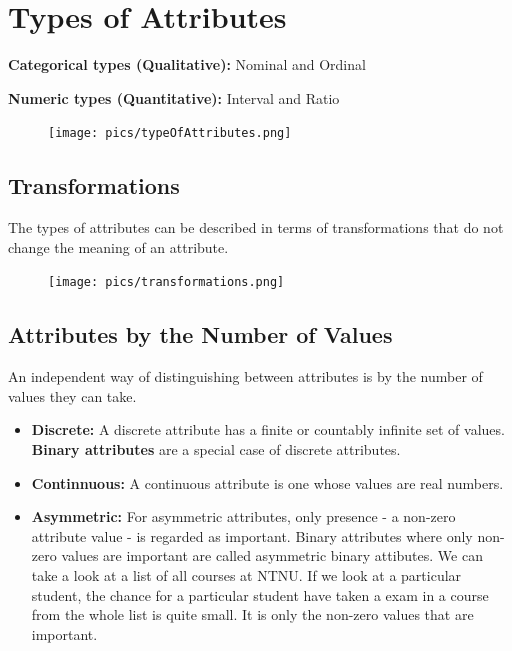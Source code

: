 \section{Types of Attributes}
	{\bf Categorical types (Qualitative):} Nominal and Ordinal

	{\bf Numeric types (Quantitative):} Interval and Ratio

		\begin{figure}[H]
			\texttt{[image: pics/typeOfAttributes.png]}
		\end{figure}

	\clearpage
	\subsection{Transformations}

		The types of attributes can be described in terms of transformations that
		do not change the meaning of an attribute. 

		\begin{figure}[H]
			\texttt{[image: pics/transformations.png]}
		\end{figure}

	\subsection{Attributes by the Number of Values}

	An independent way of distinguishing between attributes is by the number of values
	they can take.

	\begin{itemize}
		\item {\bf Discrete:} A discrete attribute has a finite or countably infinite
		set of values. {\bf Binary attributes} are a special case of discrete attributes. 
		\item {\bf Continnuous:} A continuous attribute is one whose values are real numbers.
		\item {\bf Asymmetric:} For asymmetric attributes, only presence - a non-zero attribute
		value - is regarded as important. Binary attributes where only non-zero values are 
		important are called asymmetric binary attibutes. We can take a look at a list of all 
		courses at NTNU. If we look at a particular student, the chance for a particular student
		have taken a exam in a course from the whole list is quite small. It is only the non-zero
		values that are important. 
	\end{itemize}

	\clearpage
